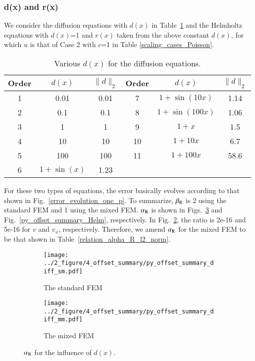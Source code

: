 \documentclass[review,3p]{elsarticle}
\begin{document}
\subsubsection{d(x) and r(x)}	\label{section_d_and_r}

We consider the diffusion equations with $d(x)$ in Table~\ref{d_diffusion_equations} and the Helmholtz equations with $d(x)$=1 and $r(x)$ taken from the above constant $d(x)$, for which $u$ is that of Case 2 with $c$=1 in Table \ref{scaling_cases_Poisson}.

\begin{table}[!ht]
\centering
\caption [w]{Various $d(x)$ for the diffusion equations.} 
\label{d_diffusion_equations}
 \begin{tabular}{c c c c c c} \hline
Order &$d(x)$ & $\|d\|_2$ & Order &$d(x)$ & $\|d\|_2$ \\ \hline
1 & 0.01 & 0.01 & 7 & $1+\sin(10x)$ & 1.14 \\ \hline
2 & 0.1 & 0.1 & 8 & $1+\sin(100x)$ & 1.06 \\ \hline
3 & 1 & 1 & 9 & $1+x$ & 1.5 \\ \hline
4 & 10 & 10 & 10 & $1+10x$ & 6.7 \\ \hline
5 & 100 & 100 & 11& $1+100x$ & 58.6 \\ \hline
6 & $1+\sin(x)$ & 1.23 & & &  \\ \hline
\end{tabular}
\end{table}

For these two types of equations, the error basically evolves according to that shown in Fig.~\ref{error_evolution_one_p}. To summarize, $\beta_{\rm R}$ is 2 using the standard FEM and 1 using the mixed FEM. $\alpha_{\rm R}$ is shown in Figs.~\ref{py_offset_summary_diff} and Fig.~\ref{py_offset_summary_Helm}, respectively. In Fig.~\ref{py_offset_summary_diff_mm}, the ratio is 2e-16 and 5e-16 for $v$ and $v_x$, respectively. Therefore, we amend $\alpha_{\rm R}$ for the mixed FEM to be that shown in Table~\ref{relation_alpha_R_l2_norm}.

\begin{figure}[!ht]
	\centering
    \begin{subfigure}{6.0cm}
        \texttt{[image: ../2\_figure/4\_offset\_summary/py\_offset\_summary\_diff\_sm.pdf]}
        \caption{The standard FEM}
        \label{py_offset_summary_diff_sm}
    \end{subfigure}
    \hspace{-0.2cm}
    \begin{subfigure}{6.0cm}
        \texttt{[image: ../2\_figure/4\_offset\_summary/py\_offset\_summary\_diff\_mm.pdf]}
        \caption{The mixed FEM}
        \label{py_offset_summary_diff_mm}
    \end{subfigure}
\caption{$\alpha_{\rm R}$ for the influence of $d(x)$.}
\label{py_offset_summary_diff}
\end{figure}
\end{document}
